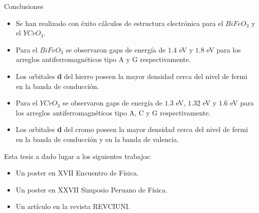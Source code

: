 \begin{frame}{Conclusiones}
    \begin{itemize}
    	\item Se han realizado con \'exito c\'alculos de estructura electr\'onica para el $BiFeO_{3}$ y el $YCrO_{3}$.
        \item Para el $BiFeO_{3}$ se observaron gaps de energ\'ia de $1.4$ eV y 
        $1.8$ eV para los arreglos antiferromagn\'eticos tipo A y G 
        respectivamente.
         \item Los orbitales \textbf{d} del hierro poseen la mayor densidad 
         cerca del nivel de fermi en la banda de conducci\'on.
        \item Para el $YCrO_{3}$ se observaron gaps de energ\'ia de $1.3$ eV, 
        $1.32$ eV y $1.6$ eV para los arreglos antiferromagn\'eticos tipo A, C 
        y G respectivamente.
        \item Los orbitales \textbf{d} del cromo poseen la mayor densidad cerca 
        del nivel de fermi en la banda de conducci\'on y en la banda de 
        valencia.
    \end{itemize}
\end{frame}

\begin{frame}
    Esta tesis a dado lugar a los siguientes trabajos:
    \begin{itemize}
        \item Un poster en XVII Encuentro de F\'isica.
        \item Un poster en XXVII Simposio Peruano de F\'isica.
        \item Un art\'iculo en la revista REVCIUNI.
    \end{itemize}
\end{frame}

\begin{frame}
    
\end{frame}